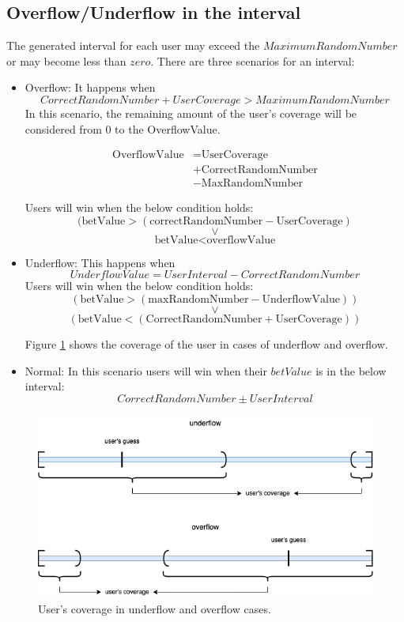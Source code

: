 \documentclass{article}
\begin{document}
\subsection{Overflow/Underflow in the interval}
The generated interval for each user may exceed the $Maximum Random Number$ or may become less than $zero$. There are three scenarios for an interval:
\begin{itemize}
    \item Overflow: It happens when
    $$CorrectRandomNumber + UserCoverage > MaximumRandomNumber$$ In this scenario, the remaining  amount of the user's coverage will be considered from 0 to the OverflowValue. 
    
    \begin{align*}
        \text{OverflowValue} &= \text{UserCoverage} \\ &+ \text{CorrectRandomNumber} \\ &-  \text{MaxRandomNumber}
    \end{align*}
    
    Users  will win when the below condition holds:
    $$(\text{betValue} > (\text{correctRandomNumber} - \text{UserCoverage})$$
    $$\lor$$
    $$
     \text{betValue} < \text{overflowValue}
    $$
    
    \item Underflow: This happens when 
    $$UnderflowValue = UserInterval - CorrectRandomNumber$$
    Users  will win when the below condition holds:
    $$
    (\text{betValue} > (\text{maxRandomNumber} - \text{UnderflowValue}))
    $$
    $$\lor$$
    $$
     (\text{betValue} < (\text{CorrectRandomNumber} + \text{UserCoverage}))
    $$
    
    Figure \ref{fig:overflow} shows the coverage of the user in cases of underflow and overflow.
    
    \item Normal: In this scenario users will win when their $betValue$ is in the below interval:
    $$
    {CorrectRandomNumber \pm{UserInterval}}
    $$
\end{itemize}

\begin{figure}
    \centering
    \includegraphics[width=\textwidth]{coverage2.png}
    \caption{User's coverage in underflow and overflow cases.}
    \label{fig:overflow}
\end{figure}
\end{document}
